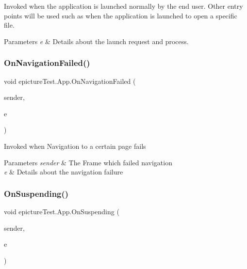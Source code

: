 Invoked when the application is launched normally by the end user. Other entry points will be used such as when the application is launched to open a specific file. 


\begin{DoxyParams}{Parameters}
{\em e} & Details about the launch request and process.\\
\hline
\end{DoxyParams}
\mbox{\label{classepicture_test_1_1_app_adec3d812ca9ceee7eff2ad6b9684fe7f}} 
\subsubsection{\texorpdfstring{On\+Navigation\+Failed()}{OnNavigationFailed()}}
{\footnotesize\ttfamily void epicture\+Test.\+App.\+On\+Navigation\+Failed (\begin{DoxyParamCaption}\item[{object}]{sender,  }\item[{Navigation\+Failed\+Event\+Args}]{e }\end{DoxyParamCaption})\hspace{0.3cm}{\ttfamily [private]}}



Invoked when Navigation to a certain page fails 


\begin{DoxyParams}{Parameters}
{\em sender} & The Frame which failed navigation\\
\hline
{\em e} & Details about the navigation failure\\
\hline
\end{DoxyParams}
\mbox{\label{classepicture_test_1_1_app_afd75e91ae3342f538aedc20e398f8f4a}} 
\subsubsection{\texorpdfstring{On\+Suspending()}{OnSuspending()}}
{\footnotesize\ttfamily void epicture\+Test.\+App.\+On\+Suspending (\begin{DoxyParamCaption}\item[{object}]{sender,  }\item[{Suspending\+Event\+Args}]{e }\end{DoxyParamCaption})\hspace{0.3cm}{\ttfamily [private]}}



